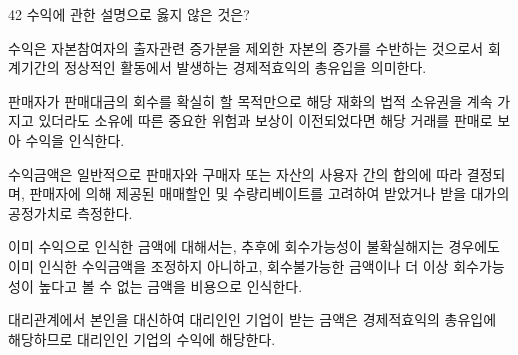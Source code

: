 \begin{question}{42}
수익에 관한 설명으로 옳지 않은 것은?
\begin{choices}
  \item 수익은 자본참여자의 출자관련 증가분을 제외한 자본의 증가를 수반하는 것으로서 회계기간의 정상적인 활동에서 발생하는 경제적효익의 총유입을 의미한다.
  \item 판매자가 판매대금의 회수를 확실히 할 목적만으로 해당 재화의 법적 소유권을 계속 가지고 있더라도 소유에 따른 중요한 위험과 보상이 이전되었다면 해당 거래를 판매로 보아 수익을 인식한다.
  \item 수익금액은 일반적으로 판매자와 구매자 또는 자산의 사용자 간의 합의에 따라 결정되며, 판매자에 의해 제공된 매매할인 및 수량리베이트를 고려하여 받았거나 받을 대가의 공정가치로 측정한다.
  \item 이미 수익으로 인식한 금액에 대해서는, 추후에 회수가능성이 불확실해지는 경우에도 이미 인식한 수익금액을 조정하지 아니하고, 회수불가능한 금액이나 더 이상 회수가능성이 높다고 볼 수 없는 금액을 비용으로 인식한다.
  \item 대리관계에서 본인을 대신하여 대리인인 기업이 받는 금액은 경제적효익의 총유입에 해당하므로 대리인인 기업의 수익에 해당한다.
\end{choices}
\end{question}
